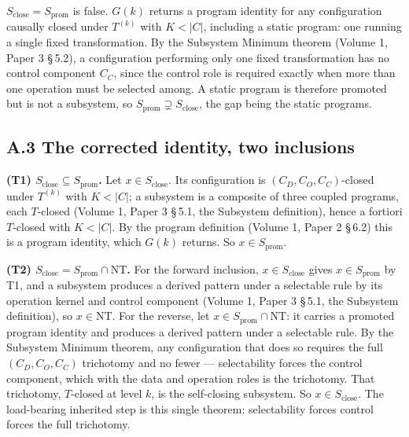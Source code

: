 \documentclass[11pt,oneside]{report}
\theoremstyle{definition}
\theoremstyle{remark}
\begin{document}
\ensuremath{S_{\mathrm{close}} = S_{\mathrm{prom}}} is false. \ensuremath{G(k)}
returns a program identity for any configuration causally closed under
\ensuremath{T^{(k)}} with \ensuremath{K < |C|}, including a static program: one
running a single fixed transformation. By the Subsystem Minimum theorem
(Volume 1, Paper 3 \S\,5.2), a configuration performing only one fixed
transformation has no control component \ensuremath{C_C}, since the control
role is required exactly when more than one operation must be selected among.
A static program is therefore promoted but is not a subsystem, so
\ensuremath{S_{\mathrm{prom}} \supsetneq S_{\mathrm{close}}}, the gap being the
static programs.

\subsection*{A.3 The corrected identity, two inclusions}

\textbf{(T1) \ensuremath{S_{\mathrm{close}} \subseteq S_{\mathrm{prom}}}.} Let
\ensuremath{x \in S_{\mathrm{close}}}. Its configuration is
\ensuremath{(C_D, C_O, C_C)}-closed under \ensuremath{T^{(k)}} with
\ensuremath{K < |C|}; a subsystem is a composite of three coupled programs,
each \ensuremath{T}-closed (Volume 1, Paper 3 \S\,5.1, the Subsystem definition), hence a fortiori
\ensuremath{T}-closed with \ensuremath{K < |C|}. By the program definition
(Volume 1, Paper 2 \S\,6.2) this is a program identity, which \ensuremath{G(k)}
returns. So \ensuremath{x \in S_{\mathrm{prom}}}.

\textbf{(T2) \ensuremath{S_{\mathrm{close}} = S_{\mathrm{prom}} \cap \mathrm{NT}}.}
For the forward inclusion, \ensuremath{x \in S_{\mathrm{close}}} gives
\ensuremath{x \in S_{\mathrm{prom}}} by T1, and a subsystem produces a derived
pattern under a selectable rule by its operation kernel and control component
(Volume 1, Paper 3 \S\,5.1, the Subsystem definition), so \ensuremath{x \in \mathrm{NT}}. For the reverse, let
\ensuremath{x \in S_{\mathrm{prom}} \cap \mathrm{NT}}: it carries a promoted
program identity and produces a derived pattern under a selectable rule. By the
Subsystem Minimum theorem, any configuration that does so requires the full
\ensuremath{(C_D, C_O, C_C)} trichotomy and no fewer --- selectability forces
the control component, which with the data and operation roles is the
trichotomy. That trichotomy, \ensuremath{T}-closed at level \ensuremath{k}, is
the self-closing subsystem. So \ensuremath{x \in S_{\mathrm{close}}}. The
load-bearing inherited step is this single theorem: selectability forces
control forces the full trichotomy.
\end{document}
